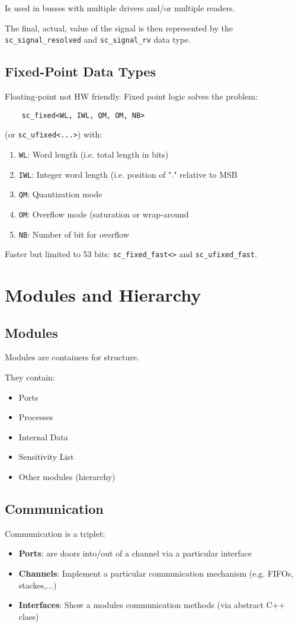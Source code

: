 Is used in busses with multiple drivers and/or multiple readers. 

The final, actual, value of the signal is then represented by the \lstinline{sc_signal_resolved} and \lstinline{sc_signal_rv} data type.

\subsection{Fixed-Point Data Types}
Floating-point not HW friendly. Fixed point logic solves the problem:
\begin{lstlisting}
    sc_fixed<WL, IWL, QM, OM, NB>
\end{lstlisting}
(or \lstinline{sc_ufixed<...>}) with:
\begin{enumerate}
    \item \lstinline{WL}: Word length (i.e. total length in bits)
    \item \lstinline{IWL}: Integer word length (i.e. position of "." relative to MSB
    \item \lstinline{QM}: Quantization mode
    \item \lstinline{OM}: Overflow mode (saturation or wrap-around
    \item \lstinline{NB}: Number of bit for overflow
\end{enumerate}

Faster but limited to 53 bits: \lstinline{sc_fixed_fast<>} and \lstinline{sc_ufixed_fast}.

\section{Modules and Hierarchy}
\subsection{Modules}
Modules are containers for structure.

They contain:
\begin{itemize}
    \item Ports
    \item Processes
    \item Internal Data
    \item Sensitivity List
    \item Other modules (hierarchy)
\end{itemize}

\subsection{Communication}
Communication is a triplet:
\begin{itemize}
    \item \textbf{Ports}: are doors into/out of a channel via a particular interface
    \item \textbf{Channels}: Implement a particular communication mechanism (e.g. FIFOs, stackes,...) 
    \item \textbf{Interfaces}: Show a modules communication methods (via abstract C++ class)
\end{itemize}

